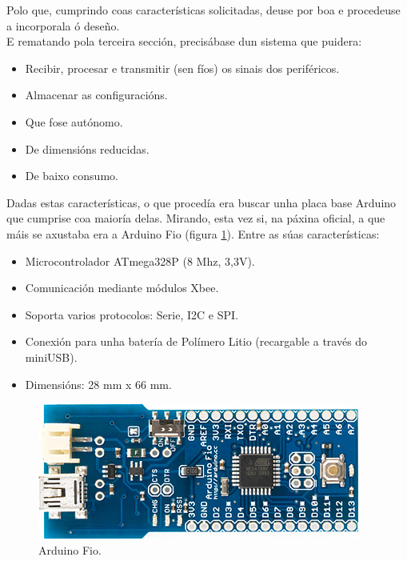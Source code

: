   Polo que, cumprindo coas características solicitadas, deuse por boa e
  procedeuse a incorporala ó deseño. \\

  E rematando pola terceira sección, precisábase dun sistema que puidera:

  \begin{itemize}
   \item Recibir, procesar e transmitir (sen fíos) os sinais dos periféricos.
   \item Almacenar as configuracións.
   \item Que fose autónomo.
   \item De dimensións reducidas.
   \item De baixo consumo.
  \end{itemize}

  Dadas estas características, o que procedía era buscar unha placa base
  Arduino que cumprise coa maioría delas. Mirando, esta vez si, na páxina
  oficial, a que máis se axustaba era a Arduino Fio \cite{ArduinoFio} (figura
  \ref{figura:ArduinoFio}). Entre as súas características:

  \begin{itemize}
   \item Microcontrolador ATmega328P (8 Mhz, 3,3V).
   \item Comunicación mediante módulos Xbee.
   \item Soporta varios protocolos: Serie, I2C e SPI.
   \item Conexión para unha batería de Polímero Litio (recargable a través do
         miniUSB).
   \item Dimensións: 28 mm x 66 mm.
  \end{itemize}

  \begin{figure}[htbp]
   \centering
   \includegraphics[scale=0.6,keepaspectratio=true]{./imagenes/arduino-fio.jpg}
   \caption{Arduino Fio.}
   \label{figura:ArduinoFio}
  \end{figure}

